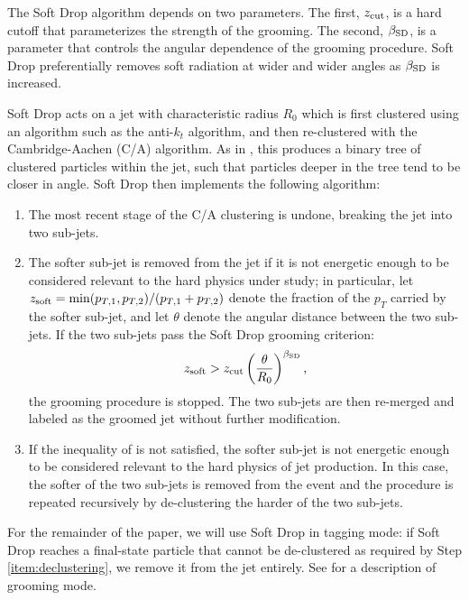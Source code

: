 The Soft Drop algorithm depends on two parameters.
%
The first, \(z_{\rm cut}\), is a hard cutoff that parameterizes the strength of the grooming.
%
The second, \(\beta_{\rm SD}\), is a parameter that controls the angular dependence of the grooming procedure.
%
Soft Drop preferentially removes soft radiation at wider and wider angles as \(\beta_{\rm SD}\) is increased.

Soft Drop acts on a jet with characteristic radius \(R_0\) which is first clustered using an algorithm such as the anti-\(k_t\) algorithm, and then re-clustered with the Cambridge-Aachen (C/A) algorithm.
%
As in , this produces a binary tree of clustered particles within the jet, such that particles deeper in the tree tend to be closer in angle.
%
Soft Drop then implements the following algorithm:
\begin{enumerate}
    \item
    \label{item:declustering}
    The most recent stage of the C/A clustering is undone, breaking the jet into two sub-jets.

    \item
    The softer sub-jet is removed from the jet if it is not energetic enough to be considered relevant to the hard physics under study;
    in particular, let \(z_{\rm soft} = \min(p_{T,1}, p_{T,2})/(p_{T,1} + p_{T,2})\) denote the fraction of the \(p_T\) carried by the softer sub-jet, and let \(\theta\) denote the angular distance between the two sub-jets.
    If the two sub-jets pass the Soft Drop grooming criterion:
     \begin{align}
        z_{\rm soft} > z_{\rm cut} \left(\frac{\theta}{R_0}\right)^{\beta_{\rm SD}}
        \label{eqn:softdropcriterion}
        ,
    \end{align}
    the grooming procedure is stopped.
    The two sub-jets are then re-merged and labeled as the groomed jet without further modification.

    \item
    If the inequality of  is not satisfied, the softer sub-jet is not energetic enough to be considered relevant to the hard physics of jet production.
    In this case, the softer of the two sub-jets is removed from the event and the procedure is repeated recursively by de-clustering the harder of the two sub-jets.
\end{enumerate}
%
For the remainder of the paper, we will use Soft Drop in tagging mode:
%
if Soft Drop reaches a final-state particle that cannot be de-clustered as required by Step \ref{item:declustering}, we remove it from the jet entirely.
%
See  for a description of grooming mode.


